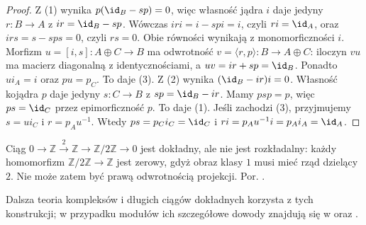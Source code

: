\begin{proof}
Z (1) wynika $p(\id_B-sp)=0$, więc własność jądra $i$ daje jedyny $r:B\to A$ z $ir=\id_B-sp$. Wówczas $iri=i-spi=i$, czyli $ri=\id_A$, oraz $irs=s-sps=0$, czyli $rs=0$. Obie równości wynikają z monomorficzności $i$. Morfizm $u=[i,s]:A\oplus C\to B$ ma odwrotność $v=\langle r,p\rangle:B\to A\oplus C$: iloczyn $vu$ ma macierz diagonalną z identycznościami, a $uv=ir+sp=\id_B$. Ponadto $ui_A=i$ oraz $pu=p_C$. To daje (3).
Z (2) wynika $(\id_B-ir)i=0$. Własność kojądra $p$ daje jedyny $s:C\to B$ z $sp=\id_B-ir$. Mamy $psp=p$, więc $ps=\id_C$ przez epimorficzność $p$. To daje (1).
Jeśli zachodzi (3), przyjmujemy $s=ui_C$ i $r=p_Au^{-1}$. Wtedy $ps=p_Ci_C=\id_C$ i $ri=p_Au^{-1}i=p_Ai_A=\id_A$.
\end{proof}
\begin{przyklad}
Ciąg $0\to\mathbb Z\xrightarrow{2}\mathbb Z\to\mathbb Z/2\mathbb Z\to0$ jest dokładny, ale nie jest rozkładalny: każdy homomorfizm $\mathbb Z/2\mathbb Z\to\mathbb Z$ jest zerowy, gdyż obraz klasy $1$ musi mieć rząd dzielący $2$. Nie może zatem być prawą odwrotnością projekcji. Por. .
\end{przyklad}
Dalsza teoria kompleksów i długich ciągów dokładnych korzysta z tych konstrukcji; w przypadku modułów ich szczegółowe dowody znajdują się w  oraz .

